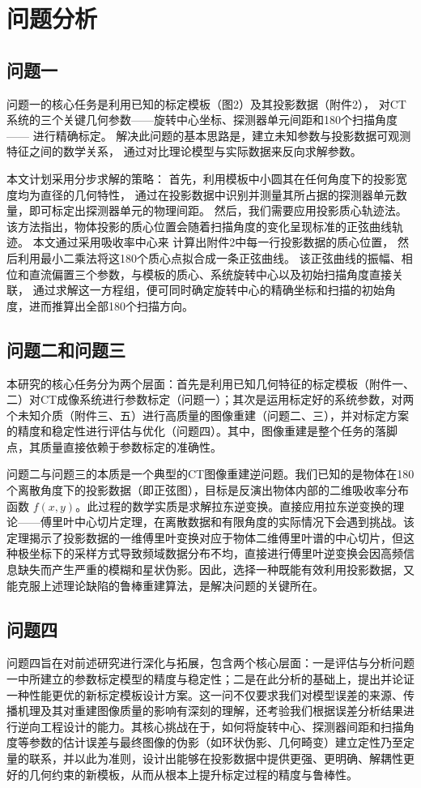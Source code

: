 \section{问题分析}
\subsection{问题一}
问题一的核心任务是利用已知的标定模板（图2）及其投影数据（附件2），
对CT系统的三个关键几何参数——旋转中心坐标、探测器单元间距和180个扫描角度 —— 进行精确标定。
解决此问题的基本思路是，建立未知参数与投影数据可观测特征之间的数学关系，
通过对比理论模型与实际数据来反向求解参数。\par
本文计划采用分步求解的策略：
首先，利用模板中小圆其在任何角度下的投影宽度均为直径的几何特性，
通过在投影数据中识别并测量其所占据的探测器单元数量，即可标定出探测器单元的物理间距。
然后，我们需要应用投影质心轨迹法。
该方法指出，物体投影的质心位置会随着扫描角度的变化呈现标准的正弦曲线轨迹。
本文通过采用吸收率中心来
计算出附件2中每一行投影数据的质心位置，
然后利用最小二乘法将这180个质心点拟合成一条正弦曲线。
该正弦曲线的振幅、相位和直流偏置三个参数，与模板的质心、系统旋转中心以及初始扫描角度直接关联，
通过求解这一方程组，便可同时确定旋转中心的精确坐标和扫描的初始角度，进而推算出全部180个扫描方向。

\subsection{问题二和问题三}
本研究的核心任务分为两个层面：首先是利用已知几何特征的标定模板（附件一、二）对CT成像系统进行参数标定（问题一）；其次是运用标定好的系统参数，对两个未知介质（附件三、五）进行高质量的图像重建（问题二、三），并对标定方案的精度和稳定性进行评估与优化（问题四）。其中，图像重建是整个任务的落脚点，其质量直接依赖于参数标定的准确性。

问题二与问题三的本质是一个典型的CT图像重建逆问题。我们已知的是物体在180个离散角度下的投影数据（即正弦图），目标是反演出物体内部的二维吸收率分布函数 $f(x,y)$。此过程的数学实质是求解拉东逆变换。直接应用拉东逆变换的理论——傅里叶中心切片定理，在离散数据和有限角度的实际情况下会遇到挑战。该定理揭示了投影数据的一维傅里叶变换对应于物体二维傅里叶谱的中心切片，但这种极坐标下的采样方式导致频域数据分布不均，直接进行傅里叶逆变换会因高频信息缺失而产生严重的模糊和星状伪影。因此，选择一种既能有效利用投影数据，又能克服上述理论缺陷的鲁棒重建算法，是解决问题的关键所在。

\subsection{问题四}

问题四旨在对前述研究进行深化与拓展，包含两个核心层面：一是评估与分析问题一中所建立的参数标定模型的精度与稳定性；二是在此分析的基础上，提出并论证一种性能更优的新标定模板设计方案。这一问不仅要求我们对模型误差的来源、传播机理及其对重建图像质量的影响有深刻的理解，还考验我们根据误差分析结果进行逆向工程设计的能力。其核心挑战在于，如何将旋转中心、探测器间距和扫描角度等参数的估计误差与最终图像的伪影（如环状伪影、几何畸变）建立定性乃至定量的联系，并以此为准则，设计出能够在投影数据中提供更强、更明确、解耦性更好的几何约束的新模板，从而从根本上提升标定过程的精度与鲁棒性。
